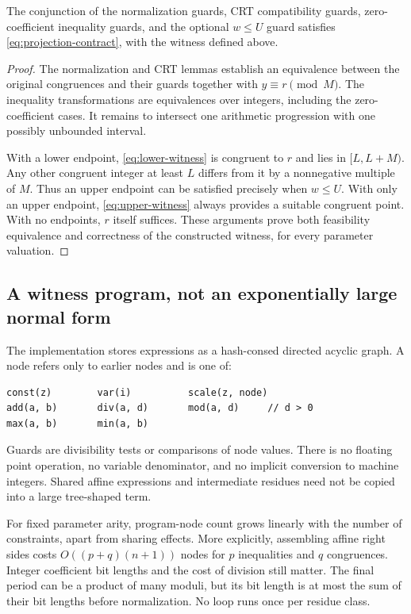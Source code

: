 \begin{theorem}
\label{thm:projection}
The conjunction of the normalization guards, CRT compatibility guards,
zero-coefficient inequality guards, and the optional $w\le U$ guard satisfies
\eqref{eq:projection-contract}, with the witness defined above.
\end{theorem}
\begin{proof}
The normalization and CRT lemmas establish an equivalence between the original
congruences and their guards together with $y\equiv r\pmod M$. The inequality
transformations are equivalences over integers, including the zero-coefficient
cases. It remains to intersect one arithmetic progression with one possibly
unbounded interval.

With a lower endpoint, \eqref{eq:lower-witness} is congruent to $r$ and lies in
$[L,L+M)$. Any other congruent integer at least $L$ differs from it by a
nonnegative multiple of $M$. Thus an upper endpoint can be satisfied precisely
when $w\le U$. With only an upper endpoint, \eqref{eq:upper-witness} always
provides a suitable congruent point. With no endpoints, $r$ itself suffices.
These arguments prove both feasibility equivalence and correctness of the
constructed witness, for every parameter valuation.
\end{proof}

\subsection{A witness program, not an exponentially large normal form}
The implementation stores expressions as a hash-consed directed acyclic graph.
A node refers only to earlier nodes and is one of:
\begin{lstlisting}
const(z)        var(i)          scale(z, node)
add(a, b)       div(a, d)       mod(a, d)     // d > 0
max(a, b)       min(a, b)
\end{lstlisting}
Guards are divisibility tests or comparisons of node values. There is no floating
point operation, no variable denominator, and no implicit conversion to machine
integers. Shared affine expressions and intermediate residues need not be
copied into a large tree-shaped term.

For fixed parameter arity, program-node count grows linearly with the number of
constraints, apart from sharing effects. More explicitly, assembling affine
right sides costs $O((p+q)(n+1))$ nodes for $p$ inequalities and $q$
congruences. Integer coefficient bit lengths and the cost of division still
matter. The final period can be a product of many moduli, but its bit length is
at most the sum of their bit lengths before normalization. No loop runs once
per residue class.


